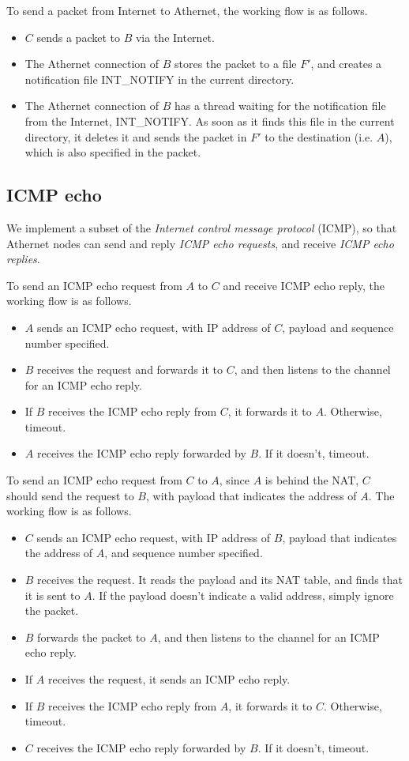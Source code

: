 \documentclass[11pt, conference]{IEEEtran}
\begin{document}
To send a packet from Internet to Athernet, the working flow is as follows.
\begin{itemize}
\item $C$ sends a packet to $B$ via the Internet.
\item The Athernet connection of $B$ stores the packet to a file $F'$, and creates a notification file \textsf{INT\_NOTIFY} in the current directory.
\item The Athernet connection of $B$ has a thread waiting for the notification file from the Internet, \textsf{INT\_NOTIFY}. As soon as it finds this file in the current directory, it deletes it and sends the packet in $F'$ to the destination (i.e. $A$), which is also specified in the packet.
\end{itemize}

\subsection{ICMP echo}

We implement a subset of the \emph{Internet control message protocol} (ICMP), so that Athernet nodes can send and reply \emph{ICMP echo requests}, and receive \emph{ICMP echo replies}.

To send an ICMP echo request from $A$ to $C$ and receive ICMP echo reply, the working flow is as follows.
\begin{itemize}
\item $A$ sends an ICMP echo request, with IP address of $C$, payload and sequence number specified.
\item $B$ receives the request and forwards it to $C$, and then listens to the channel for an ICMP echo reply.
\item If $B$ receives the ICMP echo reply from $C$, it forwards it to $A$. Otherwise, timeout.
\item $A$ receives the ICMP echo reply forwarded by $B$. If it doesn't, timeout.
\end{itemize}

To send an ICMP echo request from $C$ to $A$, since $A$ is behind the NAT, $C$ should send the request to $B$, with payload that indicates the address of $A$. The working flow is as follows.
\begin{itemize}
\item $C$ sends an ICMP echo request, with IP address of $B$, payload that indicates the address of $A$, and sequence number specified.
\item $B$ receives the request. It reads the payload and its NAT table, and finds that it is sent to $A$. If the payload doesn't indicate a valid address, simply ignore the packet.
\item $B$ forwards the packet to $A$, and then listens to the channel for an ICMP echo reply.
\item If $A$ receives the request, it sends an ICMP echo reply.
\item If $B$ receives the ICMP echo reply from $A$, it forwards it to $C$. Otherwise, timeout.
\item $C$ receives the ICMP echo reply forwarded by $B$. If it doesn't, timeout.
\end{itemize}
\end{document}
